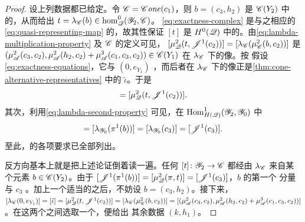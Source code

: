 \begin{proof}
设上列数据都已给定。令 $\mathscr{C}=\mathscr{C}\mathit{one}(c_1)$，则 $b=(c_3,h_2)$ 是
$\mathscr{C}(Y_2)$ 中的\trCocycle，从而给出\trModule{}\trHomomorphism{}%
$t=\lambda_{\mathscr{C}}(b)\in\hom^0_{\mathscr{Q}}(\mathscr{Y}_2,\mathscr{C})$。\trComplex{}
\eqref{eq:exactness-complex} 是与之相应的\trChainMap{}
\eqref{eq:quasi-representing-map} 的\trMappingCone，故其\trAcyclic{}性保证 $[t]$
是 $H^0(\mathscr{Q})$ 中的\trIsomorphism。由\eqref{eq:lambda-multiplication-property}
及 $\mathscr{C}$ 的定义可见，
$[\mu^2_{\mathscr{Q}}(t,\mathscr{J}^1(c_2))]=[\lambda_{\mathscr{C}}(\mu^2_{\mathscr{C}}(b,c_2))]$
是 $(\mu^2_{\mathscr{A}}(c_3,c_2),\mu^2_{\mathscr{A}}(h_2,c_2)
+\mu^3_{\mathscr{A}}(c_1,c_3,c_2))\in\mathscr{C}(Y_1)$ 在 $\lambda_{\mathscr{C}}$ 下的像。按
假设\eqref{eq:exactness-equations}，它与 $(0,e_{Y_1})$ \trCohomology，而后者在
$\lambda_{\mathscr{C}}$ 下的像正是\cref{thm:cone-alternative-representatives} 中的%
\trModule{}\trHomomorphism{} $\tilde{\iota}$。于是
\begin{equation*}
[t]=[\mu^2_{\scr{Q}}(t,\scr{J}^1(c_2))].
\end{equation*}
其次，利用\eqref{eq:lambda-second-property} 可见，在
$\operatorname{Hom}^1_{H(\mathscr{Q})}(\mathscr{Y}_2,\mathscr{Y}_0)$ 中
\begin{equation*}
[\mu^2_{\scr{Q}}(\pi,t)]=[\lambda_{\scr{Y}_0}(\pi^1(b))]
=[\lambda_{\scr{Y}_0}(c_3)]=[\scr{J}^1(c_3)].
\end{equation*}
至此，\trExactTriangle{}的各项要求已全部列出。

反方向基本上就是把上述论证倒着读一遍。任何\trMorphism{}%
$[t]\colon\mathscr{Y}_2\to\mathscr{C}$ 都经由 $\lambda_{\mathscr{C}}$ 来自某个元素
$b\in\mathscr{C}(Y_2)$。由于
$[\mathscr{J}^1(\pi^1(b))]=[\mu^2_{\mathscr{Q}}(\pi,t)]=[\mathscr{J}^1(c_3)]$，$b$ 的第一个
分量与 $c_3$ \trCohomology。加上一个适当的\trCoboundary{}之后，不妨设
$b=(c_3,h_2)$。接下来，
$[\lambda_{\mathscr{C}}(0,e_{Y_1})]=[\tilde{\iota}]
=[\mu^2_{\mathscr{Q}}(t,\mathscr{J}^1(c_2))]
=[\lambda_{\mathscr{C}}(\mu^2_{\mathscr{C}}(b,c_2))]
=[(\mu^2_{\mathscr{A}}(c_3,c_2),\mu^2_{\mathscr{A}}(h_2,c_2)
+\mu^3_{\mathscr{A}}(c_1,c_3,c_2))]$。在这两个\trCycle{}之间选取一个\trBoundingCochain，便给出
其余数据 $(k,h_1)$。
\end{proof}
